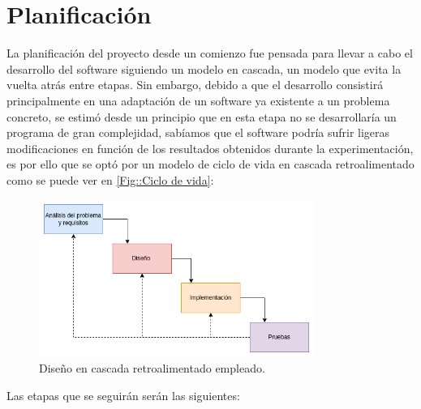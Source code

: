 \section{Planificación}
    \noindent La planificación del proyecto desde un comienzo fue pensada para llevar a cabo el desarrollo del software siguiendo un modelo en cascada, un modelo que evita la vuelta atrás entre etapas. Sin embargo, debido a que el desarrollo consistirá principalmente en una adaptación de un software ya existente a un problema concreto, se estimó desde un principio que en esta etapa no se desarrollaría un programa de gran complejidad, sabíamos que el software podría sufrir ligeras modificaciones en función de los resultados obtenidos durante la experimentación, es por ello que se optó por un modelo de ciclo de vida en cascada retroalimentado como se puede ver en \autoref{Fig::Ciclo de vida}:


    \begin{figure}[!h]
        \centering
        \includegraphics[width=0.8\textwidth]{img/disenio_cascada.png}
        \caption{Diseño en cascada retroalimentado empleado.}
        \label{Fig::Ciclo de vida}
    \end{figure}

    \medskip

    \noindent Las etapas que se seguirán serán las siguientes:

